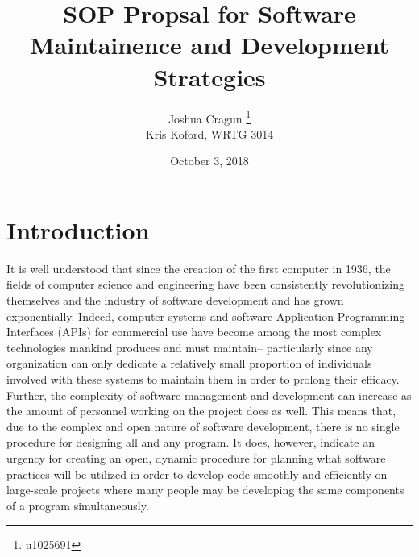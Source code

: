 \documentclass[12pt, letterpaper]{article}
\title{SOP Propsal for Software Maintainence and Development Strategies}
\author{Joshua Cragun \thanks{u1025691} \\ Kris Koford, WRTG 3014}
\date{October 3, 2018}
\begin{document}
\begin{titlepage}
\maketitle
\end{titlepage}

\pagebreak

\section{Introduction}
  It is well understood that since the creation of the first computer in 1936, the fields of computer science and engineering have been consistently revolutionizing themselves and the industry of
  software development and has grown exponentially. Indeed, computer systems and software Application Programming Interfaces (APIs) for commercial use have become among the most complex technologies
  mankind produces and must maintain-- particularly since any organization can only dedicate a relatively small proportion of individuals involved with these systems to maintain them in order to
  prolong their efficacy. Further, the complexity of software management and development can increase as the amount of personnel working on the project does as well. This means that, due to the
  complex and open nature of software development, there is no single procedure for designing all and any program. It does, however, indicate an urgency for creating an open, dynamic procedure for planning
  what software practices will be utilized in order to develop code smoothly and efficiently on large-scale projects where many people may be developing the same components of a program simultaneously.
\end{document}
